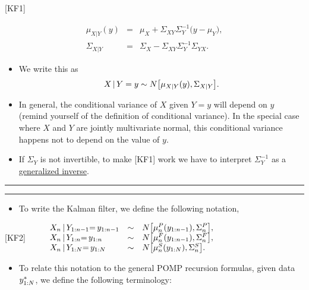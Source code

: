 \documentclass[]{article}
\providecommand{\tightlist}{%
  \setlength{\itemsep}{0pt}\setlength{\parskip}{0pt}}
\begin{document}
{[}KF1{]}

\begin{eqnarray}
\mu_{X|Y}(y) &=& \mu_X + \Sigma_{XY}\Sigma_Y^{-1}\big(y-\mu_Y\big),
\\
\Sigma_{X|Y} &=& \Sigma_X - \Sigma_{XY}\Sigma_Y^{-1}\Sigma_{YX}.
\end{eqnarray}

\begin{itemize}
\item
  We write this as
  \[ X{\, | \,} Y=y \sim N\big[\mu_{X|Y}(y),\Sigma_{X|Y}\big]. \]
\item
  In general, the conditional variance of \(X\) given \(Y=y\) will
  depend on \(y\) (remind yourself of the definition of conditional
  variance). In the special case where \(X\) and \(Y\) are jointly
  multivariate normal, this conditional variance happens not to depend
  on the value of \(y\).
\item
  If \(\Sigma_Y\) is not invertible, to make {[}KF1{]} work we have to
  interpret \(\Sigma_Y^{-1}\) as a
  \href{https://en.wikipedia.org/wiki/Generalized_inverse}{generalized
  inverse}.
\end{itemize}

\begin{center}\rule{0.5\linewidth}{\linethickness}\end{center}

\begin{center}\rule{0.5\linewidth}{\linethickness}\end{center}

\begin{itemize}
\tightlist
\item
  To write the Kalman filter, we define the following notation,
\end{itemize}

{[}KF2{]}
\(\quad\quad \begin{array}{lcl} X_{n}{\, | \,} Y_{1:n-1}{=\,} y_{1:n-1} &\sim& N\big[ \mu_{n}^P(y_{1:n-1}),\Sigma_n^P\big], \\ X_n{\, | \,} Y_{1:n}{=\,} y_{1:n} &\sim& N\big[ \mu_n^F(y_{1:n-1}),\Sigma_n^F\big], \\ X_n{\, | \,} Y_{1:N}{=\,} y_{1:N} &\sim& N\big[ \mu_n^S(y_{1:N}),\Sigma_n^S\big]. \end{array}\)

\begin{itemize}
\tightlist
\item
  To relate this notation to the general POMP recursion formulas, given
  data \(y_{1:N}^*\), we define the following terminology:
\end{itemize}
\end{document}
